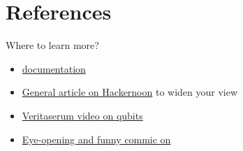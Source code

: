 \documentclass[aspectratio=43]{beamer}
\begin{document}


\section{References}
\begin{frame}{Where to learn more?}
\begin{card}
    \begin{itemize}
    \item \href{https://github.com/Qiskit/openqasm/blob/master/spec/qasm2.rst}{\qasm documentation}
    \item \href{https://hackernoon.com/quantum-computing-explained-a114999299ca}{General article on Hackernoon} to widen your view
    \item \href{https://www.youtube.com/watch?v=g_IaVepNDT4}{Veritaserum video on qubits}
    \item \href{http://www.smbc-comics.com/comic/the-talk-3}{Eye-opening and funny commic on \qc}
    \end{itemize}
\end{card}
\end{frame}
\end{document}
